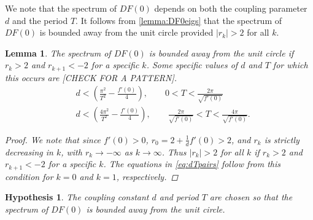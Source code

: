 \documentclass[12pt,reqno]{amsart}
\newtheorem{lemma}{Lemma}
\newtheorem{hypothesis}{Hypothesis}
\begin{document}
We note that the spectrum of $DF(0)$ depends on both the coupling parameter $d$ and the period $T$. It follows from \cref{lemma:DF0eigs} that the spectrum of $DF(0)$ is bounded away from the unit circle provided $|r_k| > 2$ for all $k$.

\begin{lemma}\label{lemma:DF0hyp}
The spectrum of $DF(0)$ is bounded away from the unit circle if $r_k > 2$ and $r_{k+1} < -2$ for a specific $k$. Some specific values of $d$ and $T$ for which this occurs are [CHECK FOR A PATTERN].
\begin{equation}\label{eq:dTpairs}
\begin{aligned}
&d < \left( \frac{\pi^2}{T^2} - \frac{f'(0)}{4} \right), \qquad 0 < T < \frac{2 \pi}{\sqrt{f'(0)}} \\
&d < \left( \frac{4 \pi^2}{T^2} - \frac{f'(0)}{4} \right), \qquad \frac{2 \pi}{\sqrt{f'(0)}} < T < \frac{4 \pi}{\sqrt{f'(0)}}.
\end{aligned} 
\end{equation}
\begin{proof}
We note that since $f'(0) > 0$, $r_0 = 2 + \frac{1}{d}f'(0) > 2$, and $r_k$ is strictly decreasing in $k$, with $r_k \rightarrow -\infty$ as $k \rightarrow \infty$. Thus $|r_k| > 2$ for all $k$ if $r_k > 2$ and $r_{k+1} < -2$ for a specific $k$. The equations in \cref{eq:dTpairs} follow from this condition for $k=0$ and $k=1$, respectively.
\end{proof}
\end{lemma}

\begin{hypothesis}\label{hyp:hyp}
The coupling constant $d$ and period $T$ are chosen so that the spectrum of $DF(0)$ is bounded away from the unit circle.
\end{hypothesis}
\end{document}
